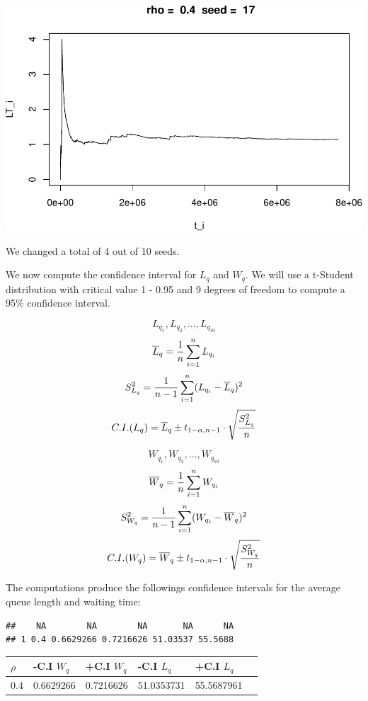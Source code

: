 \documentclass[]{article}
\begin{document}
\includegraphics{003_files/figure-latex/unnamed-chunk-14-10.pdf}

We changed a total of 4 out of 10 seeds.

We now compute the confidence interval for \(L_{q}\) and \(W_{q}\). We
will use a t-Student distribution with critical value 1 - 0.95 and 9
degrees of freedom to compute a 95\% confidence interval.

\[
L_{q_{1}},L_{q_{2}},...,L_{q_{10}} \]
\[ \overline{L}_{q} = {1 \over n}\sum_{i=1}^{n}L_{q_{i}} \]
\[ S_{L_{q}}^{2} = {1 \over n - 1} \sum_{i=1}^{n} ( L_{q_{i}} - \overline{L}_{q} )^{2} \]
\[ C.I.(L_{q}) =   \overline{L}_{q} \pm t_{1 - \alpha, n - 1} \cdot \sqrt{S_{L_{q}}^{2} \over n} \]

\[
W_{q_{1}},W_{q_{2}},...,W_{q_{10}} \]
\[ \overline{W}_{q} = {1 \over n}\sum_{i=1}^{n}W_{q_{i}} \]
\[ S_{W_{q}}^{2} = {1 \over n - 1} \sum_{i=1}^{n} ( W_{q_{i}} - \overline{W}_{q} )^{2} \]
\[ C.I.(W_{q}) =   \overline{W}_{q} \pm t_{1 - \alpha, n - 1} \cdot \sqrt{S_{W_{q}}^{2} \over n} \]

The computations produce the followings confidence intervals for the
average queue length and waiting time:

\begin{verbatim}
##    NA        NA        NA       NA      NA
## 1 0.4 0.6629266 0.7216626 51.03537 55.5688
\end{verbatim}

\begin{longtable}[]{@{}llllll@{}}
\toprule
\(\rho\) & -C.I \(W_{q}\) & +C.I \(W_{q}\) & -C.I \(L_{q}\) & +C.I
\(L_{q}\) &\tabularnewline
\midrule
\endhead
0.4 & 0.6629266 & 0.7216626 & 51.0353731 & 55.5687961\tabularnewline
\bottomrule
\end{longtable}
\end{document}
